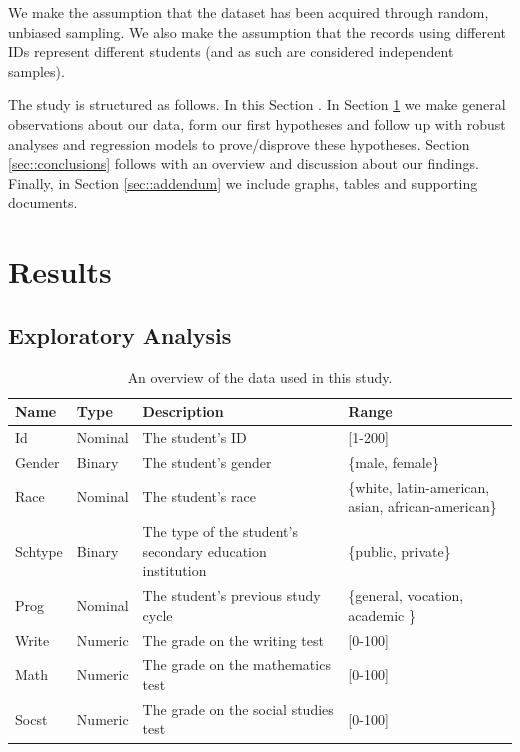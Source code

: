 \documentclass[10pt]{article}
\begin{document}
	We make the assumption that the dataset has been acquired through random, unbiased sampling. We also make the assumption that the records using different IDs represent different students (and as such are considered independent samples).
	
	The study is structured as follows. In this Section . In Section \ref{sec::results} we make general observations about our data, form our first hypotheses and follow up with robust analyses and regression models to prove/disprove these hypotheses. Section \ref{sec::conclusions} follows with an overview and discussion about our findings. Finally, in Section \ref{sec::addendum} we include graphs, tables and supporting documents.

	
	\section{Results}
	\label{sec::results}
	
	\subsection{Exploratory Analysis}
		\begin{table}
		\centering
		\begin{tabular}
			{ |p{1cm} p{1cm} p{5cm} p{3cm}| }
			\hline
			\textbf{Name} & \textbf{Type} & \textbf{Description} & \textbf{Range}\\
			\hline
			Id  & Nominal & The student's ID & [1-200] \\
			Gender  & Binary & The student's gender & \{male, female\} \\
			Race  & Nominal & The student's race & \{white, latin-american, asian, african-american\} \\
			Schtype  & Binary & The type of the student's secondary education institution & \{public, private\} \\
			Prog  & Nominal & The student's previous study cycle  & \{general, vocation, academic \} \\
			Write  & Numeric & The grade on the writing test  & [0-100] \\
			Math  & Numeric & The grade on the mathematics test  & [0-100] \\
			Socst  & Numeric & The grade on the social studies test & [0-100] \\
			\hline
		\end{tabular}
		\caption{An overview of the data used in this study.}
		\label{tab::dataset}
	\end{table}
	
\end{document}
